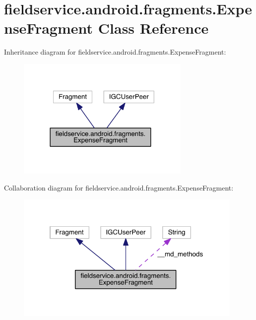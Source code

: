 \hypertarget{classfieldservice_1_1android_1_1fragments_1_1_expense_fragment}{\section{fieldservice.\+android.\+fragments.\+Expense\+Fragment Class Reference}
\label{classfieldservice_1_1android_1_1fragments_1_1_expense_fragment}
}


Inheritance diagram for fieldservice.\+android.\+fragments.\+Expense\+Fragment\+:
\nopagebreak
\begin{figure}[H]
\begin{center}
\leavevmode
\includegraphics[width=237pt]{classfieldservice_1_1android_1_1fragments_1_1_expense_fragment__inherit__graph}
\end{center}
\end{figure}


Collaboration diagram for fieldservice.\+android.\+fragments.\+Expense\+Fragment\+:
\nopagebreak
\begin{figure}[H]
\begin{center}
\leavevmode
\includegraphics[width=311pt]{classfieldservice_1_1android_1_1fragments_1_1_expense_fragment__coll__graph}
\end{center}
\end{figure}
